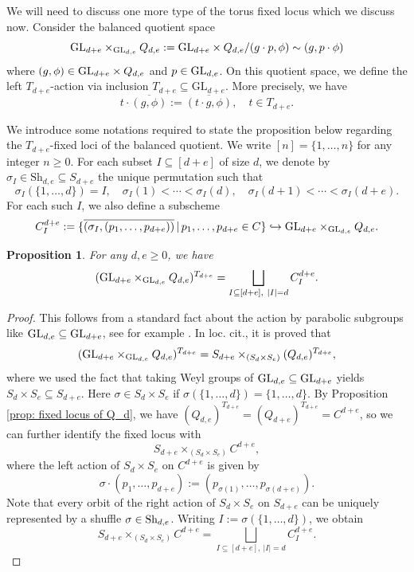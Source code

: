 \documentclass[10pt]{amsart}
\newcommand{\+}{{}^+}
\newcommand{\GL}{\textnormal{GL}}
\newcommand{\Sh}{\textnormal{Sh}}
\newtheorem {proposition}[theorem]{Proposition}
\theoremstyle{definition}
\theoremstyle {definition}
\theoremstyle {definition}
\begin{document}
We will need to discuss one more type of the torus fixed locus which we discuss now. Consider the balanced quotient space
$$\GL_{d+e}\times_{\GL_{d,e}}Q_{d,e}:=\GL_{d+e}\times Q_{d,e}/(g\cdot p,\phi)\sim (g, p\cdot\phi)
$$
where $(g,\phi)\in \GL_{d+e}\times Q_{d,e}$ and $p\in \GL_{d,e}$. On this quotient space, we define the left $T_{d+e}$-action via inclusion $T_{d+e} \subseteq \mathrm{GL}_{d+e}$. More precisely, we have 
$$t\cdot \overline{(g,\phi)}:=\overline{(t\cdot g, \phi)},\quad t\in T_{d+e}.
$$

We introduce some notations required to state the proposition below regarding the $T_{d+e}$-fixed loci of the balanced quotient. We write $[n]=\{1,\dots,n\}$ for any integer $n\geq 0$. For each subset $I\subseteq [d+e]$ of size $d$, we denote by $\sigma_I\in \mathrm{Sh}_{d,e} \subseteq S_{d+e}$ the unique permutation such that 
$$\sigma_I(\{1,\dots,d\})=I,\quad \sigma_I(1)<\cdots<\sigma_I(d),\quad \sigma_I(d+1)<\cdots<\sigma_I(d+e). 
$$
For each such $I$, we also define a subscheme
$$C^{d+e}_I:=\{\overline{(\sigma_I, (p_1,\dots,p_{d+e}))}\,|\, p_1,\dots, p_{d+e}\in C\}\hookrightarrow \GL_{d+e}\times_{\GL_{d,e}} Q_{d,e}.
$$



\begin{proposition}\label{prop: fixed locus of balanced quotient}
For any $d,e \geq 0$, we have
\[ (\GL_{d+e}\times_{\GL_{d,e}}Q_{d,e})^{T_{d+e}} = \bigsqcup_{I \subseteq [d+e],\ |I|=d} C^{d+e}_I.\] 
\end{proposition}


\begin{proof}
This follows from a standard fact about the action by parabolic subgroups like $\GL_{d,e}\subseteq \GL_{d+e}$, see for example \cite[Prop. A.18, Rem. A.19]{Minets}. In loc. cit., it is proved that 
$$(\GL_{d+e}\times_{\GL_{d,e}}Q_{d,e})^{T_{d+e}}=S_{d+e}\times_{(S_d\times S_e)} (Q_{d,e})^{T_{d+e}},
$$
where we used the fact that taking Weyl groups of $\GL_{d,e}\subseteq \GL_{d+e}$ yields $S_d\times S_e\subseteq S_{d+e}$. Here $\sigma\in S_d\times S_e$ if $\sigma(\{1,\dots,d\})=\{1,\dots,d\}$. By Proposition \ref{prop: fixed locus of Q_d}, we have $(Q_{d,e})^{T_{d+e}}=(Q_{d+e})^{T_{d+e}}=C^{d+e}$, so we can further identify the fixed locus with 
$$S_{d+e}\times_{(S_d\times S_e)}C^{d+e},
$$
where the left action of $S_d\times S_e$ on $C^{d+e}$ is given by
$$\sigma\cdot (p_1,\dots,p_{d+e}):=(p_{\sigma(1)},\dots,p_{\sigma(d+e)}).
$$
Note that every orbit of the right action of $S_d\times S_e$ on $S_{d+e}$ can be uniquely represented by a shuffle $\sigma\in \Sh_{d,e}$. Writing $I:=\sigma(\{1,\dots,d\})$, we obtain
$$S_{d+e}\times_{(S_d\times S_e)} C^{d+e}=\bigsqcup_{I\subseteq[d+e],\ |I|=d} C^{d+e}_I. 
$$

\end{proof}
\end{document}
